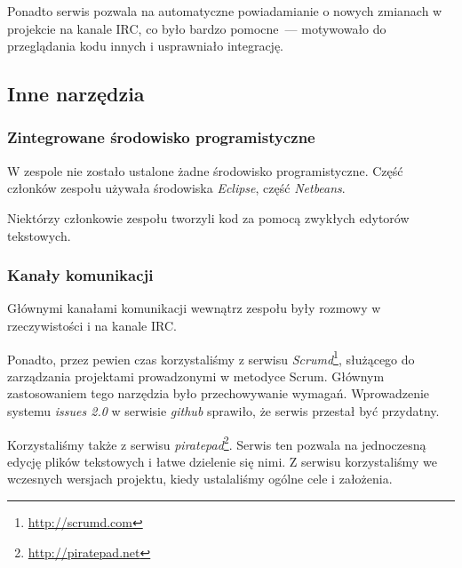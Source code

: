 Ponadto serwis pozwala na automatyczne powiadamianie o nowych zmianach w projekcie na kanale IRC, co było bardzo pomocne~--- motywowało do przeglądania kodu innych i usprawniało integrację.

\subsection{Inne narzędzia}
\subsubsection{Zintegrowane środowisko programistyczne}
W zespole nie zostało ustalone żadne środowisko programistyczne.
Część członków zespołu używała środowiska \emph{Eclipse}, część \emph{Netbeans}.

Niektórzy członkowie zespołu tworzyli kod za pomocą zwykłych edytorów tekstowych.

\subsubsection{Kanały komunikacji}
Głównymi kanałami komunikacji wewnątrz zespołu były rozmowy w rzeczywistości i na kanale IRC.

Ponadto, przez pewien czas korzystaliśmy z serwisu \emph{Scrumd}\footnote{\url{http://scrumd.com}}, służącego do zarządzania projektami prowadzonymi w metodyce Scrum.
Głównym zastosowaniem tego narzędzia było przechowywanie wymagań.
Wprowadzenie systemu \emph{issues 2.0} w serwisie \emph{github} sprawiło, że serwis przestał być przydatny.

Korzystaliśmy także z serwisu \emph{piratepad}\footnote{\url{http://piratepad.net}}.
Serwis ten pozwala na jednoczesną edycję plików tekstowych i łatwe dzielenie się nimi.
Z serwisu korzystaliśmy we wczesnych wersjach projektu, kiedy ustalaliśmy ogólne cele i założenia.


